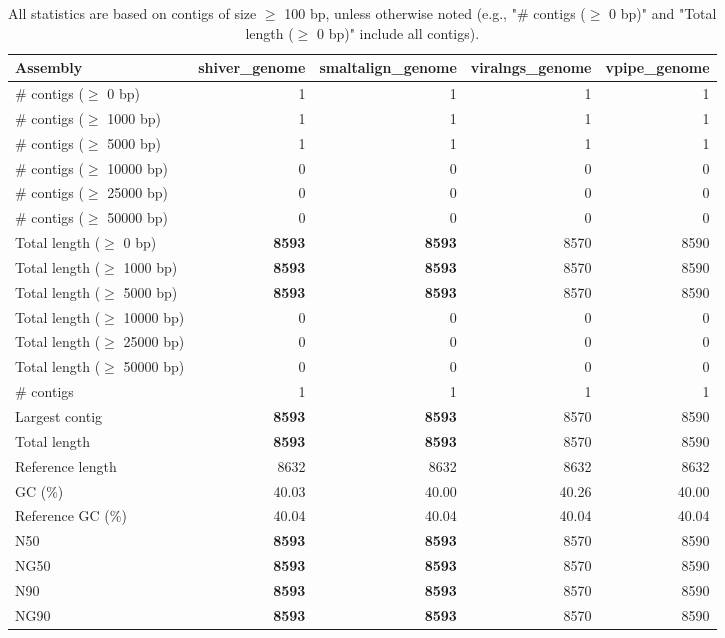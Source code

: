 \documentclass[12pt,a4paper]{article}
\begin{document}
\begin{table}[ht]
\begin{center}
\caption{All statistics are based on contigs of size $\geq$ 100 bp, unless otherwise noted (e.g., "\# contigs ($\geq$ 0 bp)" and "Total length ($\geq$ 0 bp)" include all contigs).}
\begin{tabular}{|l*{4}{|r}|}
\hline
Assembly & shiver\_genome & smaltalign\_genome & viralngs\_genome & vpipe\_genome \\ \hline
\# contigs ($\geq$ 0 bp) & 1 & 1 & 1 & 1 \\ \hline
\# contigs ($\geq$ 1000 bp) & 1 & 1 & 1 & 1 \\ \hline
\# contigs ($\geq$ 5000 bp) & 1 & 1 & 1 & 1 \\ \hline
\# contigs ($\geq$ 10000 bp) & 0 & 0 & 0 & 0 \\ \hline
\# contigs ($\geq$ 25000 bp) & 0 & 0 & 0 & 0 \\ \hline
\# contigs ($\geq$ 50000 bp) & 0 & 0 & 0 & 0 \\ \hline
Total length ($\geq$ 0 bp) & {\bf 8593} & {\bf 8593} & 8570 & 8590 \\ \hline
Total length ($\geq$ 1000 bp) & {\bf 8593} & {\bf 8593} & 8570 & 8590 \\ \hline
Total length ($\geq$ 5000 bp) & {\bf 8593} & {\bf 8593} & 8570 & 8590 \\ \hline
Total length ($\geq$ 10000 bp) & 0 & 0 & 0 & 0 \\ \hline
Total length ($\geq$ 25000 bp) & 0 & 0 & 0 & 0 \\ \hline
Total length ($\geq$ 50000 bp) & 0 & 0 & 0 & 0 \\ \hline
\# contigs & 1 & 1 & 1 & 1 \\ \hline
Largest contig & {\bf 8593} & {\bf 8593} & 8570 & 8590 \\ \hline
Total length & {\bf 8593} & {\bf 8593} & 8570 & 8590 \\ \hline
Reference length & 8632 & 8632 & 8632 & 8632 \\ \hline
GC (\%) & 40.03 & 40.00 & 40.26 & 40.00 \\ \hline
Reference GC (\%) & 40.04 & 40.04 & 40.04 & 40.04 \\ \hline
N50 & {\bf 8593} & {\bf 8593} & 8570 & 8590 \\ \hline
NG50 & {\bf 8593} & {\bf 8593} & 8570 & 8590 \\ \hline
N90 & {\bf 8593} & {\bf 8593} & 8570 & 8590 \\ \hline
NG90 & {\bf 8593} & {\bf 8593} & 8570 & 8590 \\ \hline

\end{tabular}
\end{center}
\end{table}
\end{document}
